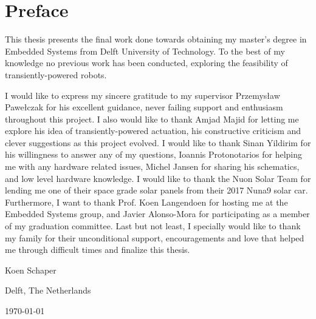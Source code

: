 \chapter*{Preface}

This thesis presents the final work done towards obtaining my master’s degree in Embedded Systems from Delft University of Technology.
To the best of my knowledge no previous work has been conducted, exploring the feasibility of transiently-powered robots. 


\vspace{1\baselineskip}

\noindent
I would like to express my sincere gratitude to my supervisor Przemys\l{}aw Pawe\l{}czak for his excellent guidance, never failing support and enthusiasm throughout this project. 
I also would like to thank Amjad Majid for letting me explore his idea of transiently-powered actuation, his constructive criticism and clever suggestions as this project evolved.
I would like to thank Sinan Yildirim for his willingness to answer any of my questions, Ioannis Protonotarios for helping me with any hardware related issues, Michel Jansen for sharing his schematics, and low level hardware knowledge.
I would like to thank the Nuon Solar Team for lending me one of their space grade solar panels from their 2017 Nuna9 solar car.
Furthermore, I want to thank Prof. Koen Langendoen for hosting me at the Embedded Systems group, and Javier Alonso-Mora for participating as a member of my graduation committee.
Last but not least, I specially would like to thank my family for their unconditional support, encouragements and love that helped me through difficult times and finalize this thesis.

\vspace{1\baselineskip}

\noindent
Koen Schaper

\vspace{1\baselineskip}

\noindent
Delft, The Netherlands

\noindent
\today

